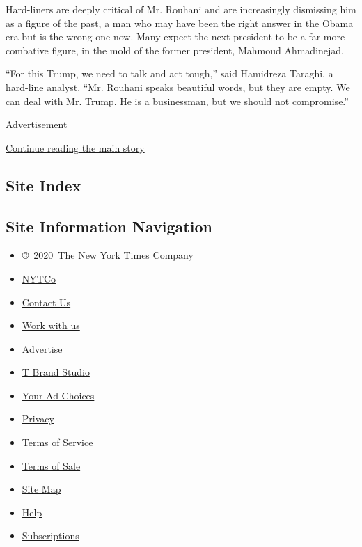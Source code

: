 Hard-liners are deeply critical of Mr. Rouhani and are increasingly
dismissing him as a figure of the past, a man who may have been the
right answer in the Obama era but is the wrong one now. Many expect the
next president to be a far more combative figure, in the mold of the
former president, Mahmoud Ahmadinejad.

``For this Trump, we need to talk and act tough,'' said Hamidreza
Taraghi, a hard-line analyst. ``Mr. Rouhani speaks beautiful words, but
they are empty. We can deal with Mr. Trump. He is a businessman, but we
should not compromise.''

Advertisement

\protect\hyperlink{after-bottom}{Continue reading the main story}

\hypertarget{site-index}{%
\subsection{Site Index}\label{site-index}}

\hypertarget{site-information-navigation}{%
\subsection{Site Information
Navigation}\label{site-information-navigation}}

\begin{itemize}
\tightlist
\item
  \href{https://help.nytimes3xbfgragh.onion/hc/en-us/articles/115014792127-Copyright-notice}{©~2020~The
  New York Times Company}
\end{itemize}

\begin{itemize}
\tightlist
\item
  \href{https://www.nytco.com/}{NYTCo}
\item
  \href{https://help.nytimes3xbfgragh.onion/hc/en-us/articles/115015385887-Contact-Us}{Contact
  Us}
\item
  \href{https://www.nytco.com/careers/}{Work with us}
\item
  \href{https://nytmediakit.com/}{Advertise}
\item
  \href{http://www.tbrandstudio.com/}{T Brand Studio}
\item
  \href{https://www.nytimes3xbfgragh.onion/privacy/cookie-policy\#how-do-i-manage-trackers}{Your
  Ad Choices}
\item
  \href{https://www.nytimes3xbfgragh.onion/privacy}{Privacy}
\item
  \href{https://help.nytimes3xbfgragh.onion/hc/en-us/articles/115014893428-Terms-of-service}{Terms
  of Service}
\item
  \href{https://help.nytimes3xbfgragh.onion/hc/en-us/articles/115014893968-Terms-of-sale}{Terms
  of Sale}
\item
  \href{https://spiderbites.nytimes3xbfgragh.onion}{Site Map}
\item
  \href{https://help.nytimes3xbfgragh.onion/hc/en-us}{Help}
\item
  \href{https://www.nytimes3xbfgragh.onion/subscription?campaignId=37WXW}{Subscriptions}
\end{itemize}
